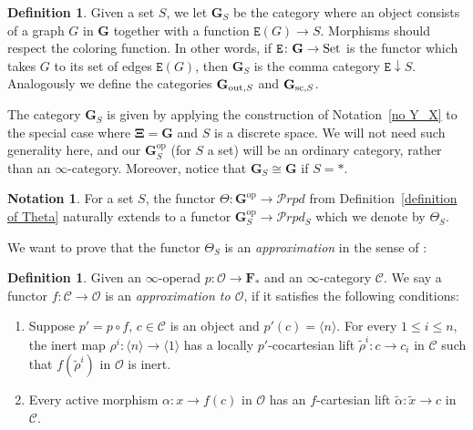 \documentclass{amsart}
\numberwithin{theorem}{subsection}
\theoremstyle{definition}
\newtheorem{definition}[theorem]{Definition}
\newtheorem{notation}[theorem]{Notation}
\providecommand{\op}{\mathrm{op}}
\newcommand{\finsetskel}{\mathbf{F}}
\newcommand{\pfinsetskel}{\finsetskel_*}
\newcommand{\xxO}{\mathcal{O}}
\newcommand{\xcc}{\mathcal{C}}
\newcommand{\icat}{$\infty$-category}
\newcommand{\name}[1]{\ensuremath{\text{\textup{#1}}}}
\newcommand{\bbY}{\mathbf{G}}
\newcommand{\gc}{\mathbf{\Xi}}
\newcommand{\Set}{\name{Set}}
\newcommand{\edge}{\mathtt{E}}
\newcommand{\calproperad}{\mathcal{P}rpd}
\begin{document}
\begin{definition}\label{def Y_S}
Given a set $S$, we let $\bbY_S$ be the category where an object consists of a graph $G$ in $\bbY$ together with a function $\edge(G) \to S$.
Morphisms should respect the coloring function.
In other words, if $\edge \colon \bbY \to \Set$ is the functor which takes $G$ to its set of edges $\edge(G)$, then $\bbY_S $ is the comma category $\edge \downarrow S$. Analogously we define the categories $\bbY_{\name{out},S}$ and $\bbY_{\name{sc}, S}$.
\end{definition}

The category $\bbY_S$ is given by applying the construction of Notation~\ref{no Y_X} to the special case where $\gc = \bbY$ and $S$ is a discrete space.
We will not need such generality here, and our $\bbY^\op_S$ (for $S$ a set) will be an ordinary category, rather than an \icat. Moreover, notice that $\bbY_S\cong \bbY$ if $S=*$.

\begin{notation}\label{no Theta_S}
	For a set $S$, the functor $\Theta \colon \bbY^\op \to \calproperad$ from Definition~\ref{definition of Theta} naturally extends to a functor $\bbY^\op_S \to \calproperad_S$ which we denote by $\Theta_S$.
\end{notation}

We want to prove that the functor $\Theta_S$ is an
\emph{approximation} in the sense of \cite[Definition 2.3.3.6]{ha}:
\begin{definition}\label{def approximation}
Given an $\infty$-operad $p\colon \xxO \to \pfinsetskel$ and an $\infty$-category $\xcc$.
	We say a functor $f\colon \xcc\to \xxO$ is an \emph{approximation to $\xxO$}, if it satisfies the following conditions:
	\begin{enumerate}
		\item Suppose $p'=p\circ f$, $c\in \xcc$ is an object and $p'(c)=\langle n\rangle$.
		For every $1\leq i\leq n$, the inert map $\rho^i\colon\langle n\rangle\to \langle 1\rangle$ has a locally $p'$-cocartesian lift $\tilde \rho^i\colon c\to c_i $ in $\xcc$ such that $f(\tilde \rho^i)$ in $\xxO$ is inert.
		\item Every active morphism $\alpha\colon x\to f(c)$ in $\xxO$ has an $f$-cartesian lift $\tilde \alpha\colon \tilde x\to c$ in $\xcc$.
	\end{enumerate}
\end{definition}
\end{document}
